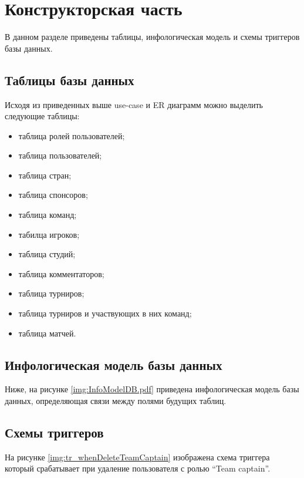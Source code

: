 \chapter{Конструкторская часть}
\label{cha:design}

В данном разделе приведены таблицы, инфологическая модель и схемы триггеров базы данных.

\section{Таблицы базы данных}
Исходя из приведенных выше use-case и ER диаграмм можно выделить следующие таблицы:

\begin{itemize}
	\item таблица ролей пользователей;
	\item таблица пользователей;
	\item таблица стран;
	\item таблица спонсоров;
	\item таблица команд;
	\item табилца игроков;
	\item таблица студий;
	\item таблица комментаторов;
	\item таблица турниров;
	\item таблица турниров и участвующих в них команд;
	\item таблица матчей.
\end{itemize}

\newpage
\section{Инфологическая модель базы данных}
Ниже, на рисунке \ref{img:InfoModelDB.pdf} приведена инфологическая модель базы данных, определяющая связи между полями будущих таблиц.


\newpage
\section{Схемы триггеров}
На рисунке \ref{img:tr_whenDeleteTeamCaptain} изображена схема триггера который срабатывает при удаление пользователя с ролью \textquotedblleft Team captain\textquotedblright.


